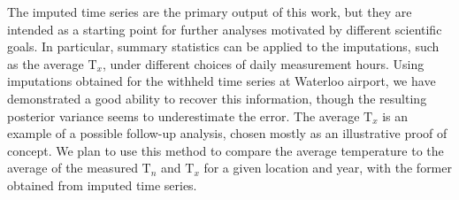 \documentclass[letter]{article}
\newcommand{\T}{\mathrm{T}}
\newcommand{\Tn}{\T_{n}}
\newcommand{\Tx}{\T_{x}}
\begin{document}
        The imputed time series are the primary output of this work, but they are intended as a starting point for further analyses motivated by different scientific goals.
In particular, summary statistics can be applied to the imputations, such as the average \(\Tx\), under different choices of daily measurement hours.
Using imputations obtained for the withheld time series at Waterloo airport, we have demonstrated a good ability to recover this information, though the resulting posterior variance seems to underestimate the error.
The average \(\Tx\) is an example of a possible follow-up analysis, chosen mostly as an illustrative proof of concept.
We plan to use this method to compare the average temperature to the average of the measured \(\Tn\) and \(\Tx\) for a given location and year, with the former obtained from imputed time series.
    

\appendix
%
%    
%
%    
%
%
%    
%
%
%    
%
%
%    
\end{document}
